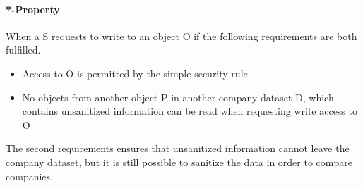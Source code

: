\paragraph{*-Property}

When a \principal{} S requests to write to an object O if the following requirements are both fulfilled.

\begin{itemize}
\item Access to O is permitted by the simple security rule
\item No objects from another object P in another company dataset D, which contains unsanitized information can be read when requesting write access to O
\end{itemize}

The second requirements ensures that unsanitized information cannot leave the company dataset, but it is still possible to sanitize the data in order to compare companies.
